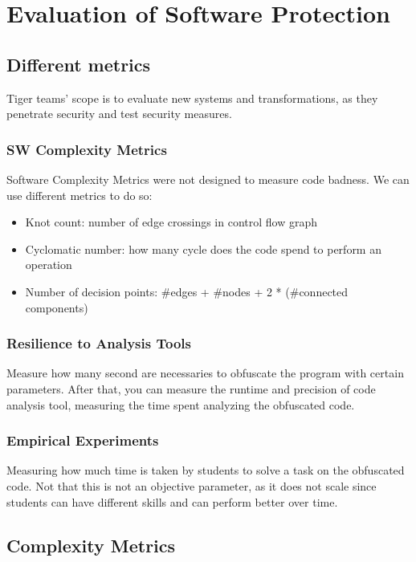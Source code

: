 \section{Evaluation of Software Protection}

\subsection{Different metrics}

Tiger teams' scope is to evaluate new systems and transformations, as they penetrate security and test security measures.  

\subsubsection{SW Complexity Metrics}

Software Complexity Metrics were not designed to measure code badness. 
We can use different metrics to do so: 
\begin{itemize}
    \item Knot count: number of edge crossings in control flow graph
    \item Cyclomatic number: how many cycle does the code spend to perform an operation
    \item Number of decision points: #edges + #nodes + 2 * (#connected components)
\end{itemize}

\subsubsection{Resilience to Analysis Tools}

Measure how many second are necessaries to obfuscate the program with certain parameters. After that, you can measure the runtime and precision of code analysis tool, measuring the time spent analyzing the obfuscated code.

\subsubsection{Empirical Experiments}

Measuring how much time is taken by students to solve a task on the obfuscated code. Not that this is not an objective parameter, as it does not scale since students can have different skills and can perform better over time. 


\subsection{Complexity Metrics}

